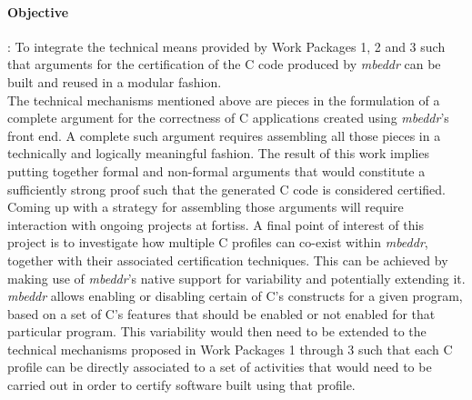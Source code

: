 \paragraph{\textbf{Objective}}: To integrate the technical means provided by
Work Packages 1, 2 and 3 such that arguments for the certification of the C code
produced by \emph{mbeddr} can be built and reused in a modular
fashion.\vspace{.2cm}\\
The technical mechanisms mentioned above are pieces in the formulation of a
complete argument for the correctness of C applications created using
\emph{mbeddr}’s front end. A complete such argument requires assembling all
those pieces in a technically and logically meaningful fashion. The result of
this work implies putting together formal and non-formal arguments that would
constitute a sufficiently strong proof such that the generated C code is
considered certified.
Coming up with a strategy for assembling those arguments will require
interaction with ongoing projects at fortiss. A final point of interest of this
project is to investigate how multiple C profiles can co-exist within
\emph{mbeddr}, together with their associated certification techniques. This can
be achieved by making use of \emph{mbeddr}’s native support for variability and
potentially extending it. \emph{mbeddr} allows enabling or disabling certain
of C’s constructs for a given program, based on a set of C's features that
should be enabled or not enabled for that particular program.
This variability would then need to be extended to the technical mechanisms
proposed in Work Packages 1 through 3 such that each C profile can be directly
associated to a set of activities that would need to be carried out in order to
certify software built using that profile.

